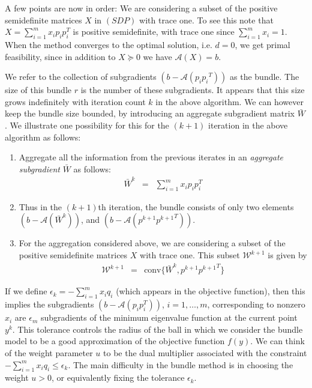 \documentclass[12pt]{kluwer}
\begin{document}
\begin{article}
A few points are now in order:
We are considering a subset of the positive semidefinite matrices $X$ in $(SDP)$ with trace one.
To see this note that $X = \sum_{i=1}^mx_ip_ip_i^T$ is positive semidefinite, with trace one since
$\sum_{i=1}^mx_i = 1$.
When the method converges to the optimal solution, i.e. $d = 0$, we get
primal feasibility, since in addition to $X \succeq 0$ we have $\mathcal{A}(X) = b$.

We refer to the collection of subgradients $(b-\mathcal{A}(p_i{p_i}^T))$ as the bundle. The size
of this bundle $r$ is the number of these subgradients. It appears
that this size grows indefinitely with iteration count $k$ in the above algorithm. We can however
keep the bundle size bounded, by introducing an aggregate subgradient matrix $\bar{W}$. We illustrate one possibility for
this for the $(k+1)$ iteration in the above algorithm as follows:
\begin{enumerate}
\item Aggregate all the information from the previous iterates in an {\em aggregate subgradient} $\bar{W}$
as follows:
\begin{displaymath}
\begin{array}{ccc}
\bar{W}^k & = & \sum_{i=1}^mx_ip_ip_i^T
\end{array}
\end{displaymath}
\item Thus in the $(k+1)$th iteration, the bundle consists of only two elements $(b - \mathcal{A}(\bar{W}^k))$, and
$(b - \mathcal{A}(p^{k+1}{p^{k+1}}^T))$. 
\item For the aggregation considered above, we are considering a subset of the positive semidefinite matrices
$X$ with trace one. This subset $\mathcal{W}^{k+1}$ is given by
\begin{equation}
\label{subset_of_primal_X_in_proximal}
\begin{array}{ccc}
\mathcal{W}^{k+1} & = & \mbox{conv}\{\bar{W}^k,p^{k+1}{p^{k+1}}^T\}
\end{array}
\end{equation}
\end{enumerate}

If we define $\epsilon_k = - \sum_{i=1}^mx_iq_i$ (which appears in the objective function), then
this implies the subgradients $(b - \mathcal{A}(p_ip_i^T))$, $ i=1,\ldots,m$,
corresponding to nonzero $x_i$ are $\epsilon_m$ subgradients of the 
minimum eigenvalue function at the current point $y^k$. This tolerance controls the radius of the ball
in which we consider the bundle model to be a good approximation of the objective function $f(y)$.
We can think of the weight parameter $u$ to be the dual multiplier associated with the
constraint $- \sum_{i=1}^mx_iq_i \le \epsilon_k$. The main difficulty in the bundle method is in choosing
the weight $u > 0$, or equivalently fixing the tolerance $\epsilon_k$.


\end{article}
\end{document}
